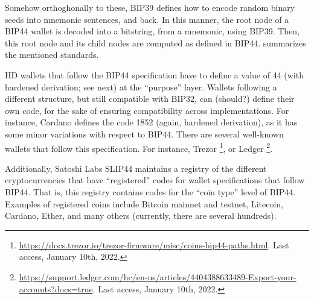 Somehow orthoghonally to these, BIP39 defines how to encode random binary seeds
into mnemonic sentences, and back. In this manner, the root node of a BIP44
wallet is decoded into a bitstring, from a mnemonic, using BIP39. Then, this
root node and its child nodes are computed as defined in BIP44. 
summarizes the mentioned standards.

\begin{table}[ht!]
  \centering
  \caption{Summary of BIPs for HD wallets.}
  \label{tab:bips}
\end{table}

HD wallets that follow the BIP44 specification have to define a value of 44
(with hardened derivation; see next) at the ``purpose'' layer. Wallets following
a different structure, but still compatible with BIP32, can (should?) define
their own code, for the sake of ensuring compatibility across implementations.
For instance, Cardano defines the code 1852 (again, hardened derivation), as
it has some minor variations with respect to BIP44. There are several well-known
wallets that follow this specification. For instance, Trezor%
\footnote{\url{https://docs.trezor.io/trezor-firmware/misc/coins-bip44-paths.html}.
  Last access, January 10th, 2022.}, or Ledger%
\footnote{\url{https://support.ledger.com/hc/en-us/articles/4404388633489-Export-your-accounts?docs=true}.
Last access, January 10th, 2022.}.

Additionally, Satoshi Labs SLIP44 maintains a registry of the different
cryptocurrencies that have ``registered'' codes for wallet specifications
that follow BIP44. That is, this registry contains codes for the ``coin type''
level of BIP44. Examples of registered coins include Bitcoin mainnet and testnet,
Litecoin, Cardano, Ether, and many others (currently, there are several
hundreds).


